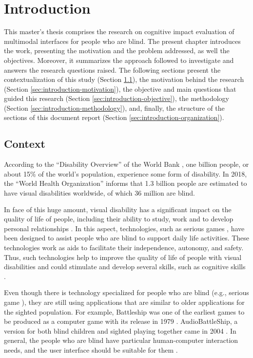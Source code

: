 \chapter{Introduction}
\label{cap:introduction}

This master’s thesis comprises the research on cognitive impact evaluation of multimodal interfaces for people who are blind. The present chapter introduces the work, presenting the motivation and the problem addressed, as well the objectives. Moreover, it summarizes the approach followed to investigate and answers the research questions raised. The following sections present the contextualization of this study (Section \ref{sec:introduction-context}), the motivation behind the research (Section \ref{sec:introduction-motivation}), the objective and main questions that guided this research (Section \ref{sec:introduction-objective}), the methodology (Section \ref{sec:introduction-methodology}), and, finally, the structure of the sections of this document report (Section \ref{sec:introduction-organization}).

\section{Context}
\label{sec:introduction-context}
According to the ``Disability Overview'' of the World Bank \cite{TheWorldBank2016}, one billion people, or about 15\% of the world's population, experience some form of disability. In 2018, the ``World Health Organization'' \cite{WHO2018Blindness} informs that 1.3 billion people are estimated to have visual disabilities worldwide, of which 36 million are blind.

In face of this huge amount, visual disability has a significant impact on the quality of life of people, including their ability to study, work and to develop personal relationships \cite{Bamac2004}. In this aspect, technologies, such as serious games \cite{Sanchez2015}, have been designed to assist people who are blind to support daily life activities. These technologies work as aids to facilitate their independence, autonomy, and safety. Thus, such technologies help to improve the quality of life of people with visual disabilities and could stimulate and develop several skills, such as cognitive skills \cite{Darin2015}.

Even though there is technology specialized for people who are blind (e.g., serious game \cite{Darin2015}), they are still using applications that are similar to older applications for the sighted population. For example, Battleship was one of the earliest games to be produced as a computer game with its release in 1979 \cite{Hinebaugh2009}. AudioBattleShip, a version for both blind children and sighted playing together came in 2004 \cite{Sanchez2004}. In general, the people who are blind have particular human-computer interaction needs, and the user interface should be suitable for them \cite{Sanchez2015}.

